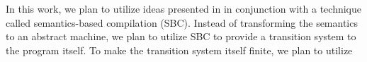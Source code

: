 
In this work, we plan to utilize ideas presented in \cite{KoppelICFP22}
in conjunction with a technique called semantics-based compilation (SBC).
Instead of transforming the semantics to an abstract machine, we plan
to utilize SBC to provide a transition system  to the
program itself. To make the transition system itself finite, we plan
to utilize







%
%

